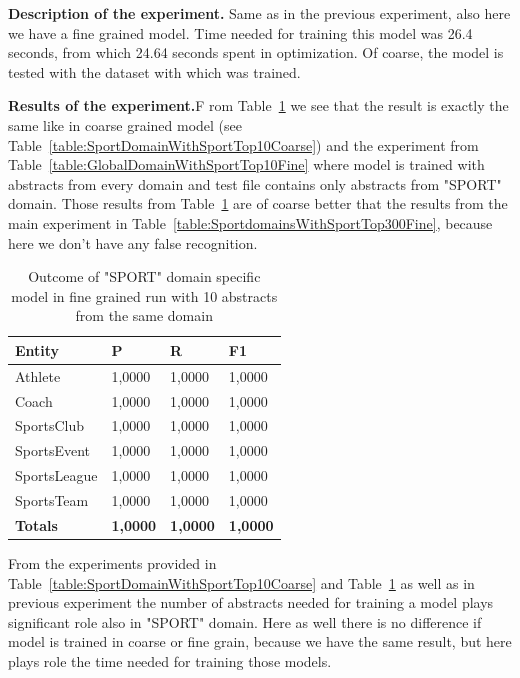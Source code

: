 \documentclass[thesis=M,english]{FITthesis}[2018/05/30]
\begin{document}
	\textbf{Description of the experiment.} Same as in the previous experiment, also here we have a fine grained model. Time needed for training this model was 26.4 seconds, from which 24.64 seconds spent in optimization. Of coarse, the model is tested with the dataset with which was trained.
	
	\textbf{Results of the experiment.}F rom Table~\ref{table:SportDomainWithSportTop10Fine} we see that the result is exactly the same like in coarse grained model (see Table~\ref{table:SportDomainWithSportTop10Coarse}) and the experiment from Table~\ref{table:GlobalDomainWithSportTop10Fine} where model is trained with abstracts from every domain and test file contains only abstracts from "SPORT" domain. Those results from Table~\ref{table:SportDomainWithSportTop10Fine} are of coarse better that the results from the main experiment in Table~\ref{table:SportdomainsWithSportTop300Fine}, because here we don't have any false recognition.
	 
	\begin{table}[H]\centering
		\begin{tabular}{|l|l|l|l|}
			\hline {\textbf{Entity}} & {\textbf{P}} & {\textbf{R}} & {\textbf{F1}}\\\hline
				Athlete & 1,0000 & 1,0000 & 1,0000\\
				Coach & 1,0000 & 1,0000 & 1,0000\\
				SportsClub & 1,0000 & 1,0000 & 1,0000\\
				SportsEvent & 1,0000 & 1,0000 & 1,0000\\
				SportsLeague & 1,0000 & 1,0000 & 1,0000\\
				SportsTeam & 1,0000 & 1,0000 & 1,0000\\\hline
				\textbf{Totals} & \textbf{1,0000} & \textbf{1,0000} & \textbf{1,0000}\\\hline
		\end{tabular}
		\caption{Outcome of "SPORT" domain specific model in fine grained run with 10 abstracts from the same domain \label{table:SportDomainWithSportTop10Fine}}
	\end{table}	

	From the experiments provided in Table~\ref{table:SportDomainWithSportTop10Coarse} and Table~\ref{table:SportDomainWithSportTop10Fine} as well as in previous experiment the number of abstracts needed for training a model plays significant role also in "SPORT" domain. Here as well there is no difference if model is trained in coarse or fine grain, because we have the same result, but here plays role the time needed for training those models.
	
\end{document}
